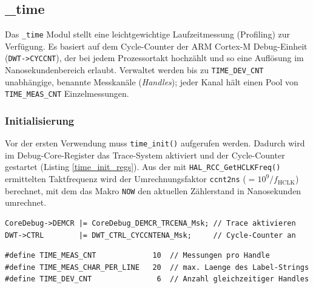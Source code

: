 \subsection{\_time}\label{time}
Das \verb|_time| Modul stellt eine leichtgewichtige Laufzeitmessung
(Profiling) zur Verfügung. Es basiert auf dem Cycle-Counter der
ARM Cortex-M Debug-Einheit (\verb|DWT->CYCCNT|), der bei jedem
Prozessortakt hochzählt und so eine Auflösung im Nanosekundenbereich
erlaubt. Verwaltet werden bis zu \verb|TIME_DEV_CNT| unabhängige,
benannte Messkanäle (\emph{Handles}); jeder Kanal hält einen Pool von
\verb|TIME_MEAS_CNT| Einzelmessungen.

\subsubsection*{Initialisierung}
Vor der ersten Verwendung muss \verb|time_init()| aufgerufen werden.
Dadurch wird im Debug-Core-Register das Trace-System aktiviert und der
Cycle-Counter gestartet (Listing \ref{time_init_regs}). Aus der mit
\verb|HAL_RCC_GetHCLKFreq()| ermittelten Taktfrequenz wird der
Umrechnungsfaktor \verb|ccnt2ns| ($= 10^9 / f_{\mathrm{HCLK}}$)
berechnet, mit dem das Makro \verb|NOW| den aktuellen Zählerstand in
Nanosekunden umrechnet.

\begin{listing}
\begin{verbatim}
CoreDebug->DEMCR |= CoreDebug_DEMCR_TRCENA_Msk; // Trace aktivieren
DWT->CTRL        |= DWT_CTRL_CYCCNTENA_Msk;     // Cycle-Counter an
\end{verbatim}
\caption{Aktivierung des DWT-Cycle-Counters in \texttt{time\_init()}}
\label{time_init_regs}
\end{listing}

\begin{listing}
\begin{verbatim}
#define TIME_MEAS_CNT             10  // Messungen pro Handle
#define TIME_MEAS_CHAR_PER_LINE   20  // max. Laenge des Label-Strings
#define TIME_DEV_CNT               6  // Anzahl gleichzeitiger Handles
\end{verbatim}
\caption{Konfigurationskonstanten aus \texttt{\_time.h}}
\label{time_defines}
\end{listing}

